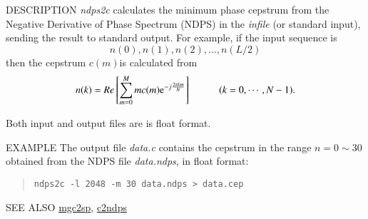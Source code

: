 \begin{synopsis}
 \item[ndps2c] [ --l $L$ ] [ --m $M$ ] [ {\em infile} ]
\end{synopsis}

\begin{qsection}{DESCRIPTION}
{\em ndps2c} calculates the minimum phase cepstrum 
from the Negative Derivative of Phase Spectrum (NDPS)
in the {\em infile} (or standard input), 
sending the result to standard output.
For example, if the input sequence is
\begin{displaymath}
   n(0),n(1),n(2),\dots,n(L/2)
\end{displaymath}
then the cepstrum $c(m)$is calculated from
\begin{displaymath}
 n(k) = Re \left[ \sum^{M}_{m=0}mc(m)\mathrm{e}^{-j\frac{2\pi km}{N}} \right]\hspace{10mm} (k=0,\cdots,N-1).
\end{displaymath}

Both input and output files are is float format.

\end{qsection}

\begin{options}
\end{options}

\begin{qsection}{EXAMPLE}
The output file {\em data.c} contains the cepstrum
in the range $n = 0 \sim 30$ obtained from the NDPS
 file {\em data.ndps}, in float format:
 \begin{quote}
  \verb!ndps2c -l 2048 -m 30 data.ndps > data.cep!
 \end{quote}
\end{qsection}

\begin{qsection}{SEE ALSO}
\hyperlink{mgc2sp}{mgc2sp},
\hyperlink{c2ndps}{c2ndps}
\end{qsection}
